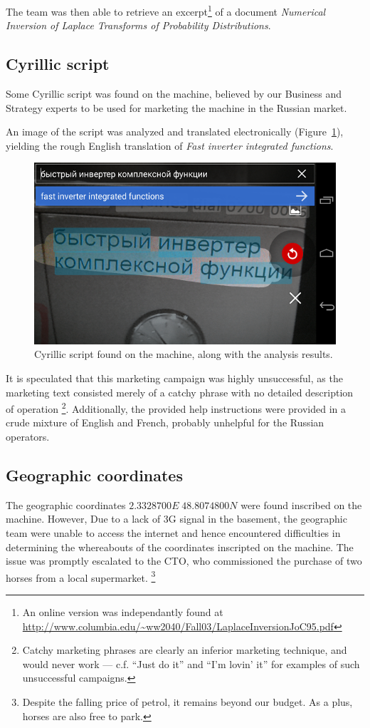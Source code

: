 The team was then able to retrieve an excerpt\footnote{An online version was independantly found at \url{http://www.columbia.edu/~ww2040/Fall03/LaplaceInversionJoC95.pdf}} of a document \emph{Numerical Inversion of Laplace Transforms of Probability Distributions}.



\subsection{Cyrillic script}
Some Cyrillic script was found on the machine, believed by our Business and Strategy experts to be used for marketing the machine in the Russian market.

An image of the script was analyzed and translated electronically (Figure~\ref{fig:cyrillic-script}), yielding the rough English translation of \emph{Fast inverter integrated functions}.

\begin{figure}[h]
	\centering
	\includegraphics[width=0.8\columnwidth]{img/cyrillic-script.png}
	\caption{Cyrillic script found on the machine, along with the analysis results.}
	\label{fig:cyrillic-script}
\end{figure}

It is speculated that this marketing campaign was highly unsuccessful, as the marketing text consisted merely of a catchy phrase with no detailed description of operation \footnote{Catchy marketing phrases are clearly an inferior marketing technique, and would never work --- c.f. ``Just do it'' and ``I'm lovin' it'' for examples of such unsuccessful campaigns.}. Additionally, the provided help instructions were provided in a crude mixture of English and French, probably unhelpful for the Russian operators.




\subsection{Geographic coordinates}
The geographic coordinates $2.3328700E \; 48.8074800N$ were found inscribed on the machine. However, Due to a lack of 3G signal in the basement, the geographic team were unable to access the internet and hence encountered difficulties in determining the whereabouts of the coordinates inscripted on the machine. The issue was promptly escalated to the CTO, who commissioned the purchase of two horses from a local supermarket. \footnote{Despite the falling price of petrol, it remains beyond our budget. As a plus, horses are also free to park.}

